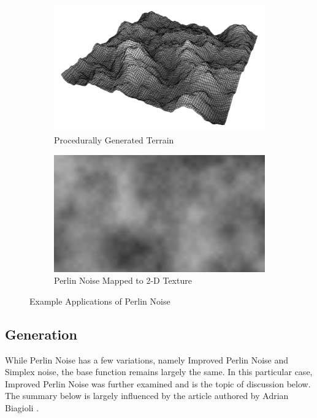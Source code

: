 \begin{figure}
    \centering
    \begin{subfigure}[b]{0.49\textwidth}
        \centering
        \includegraphics[width=\textwidth]{figures/body/methodology/perlin_noise_terrain_mesh.png}
        \caption{Procedurally Generated Terrain \cite{prunier}}
        \label{figure:perlin_noise_terrain_mesh}
    \end{subfigure}
    \begin{subfigure}[b]{0.49\textwidth}
        \centering
        \includegraphics[width=\textwidth]{figures/body/methodology/perlin_noise_texture.png}
        \caption{Perlin Noise Mapped to 2-D Texture \cite{perlin_noise_2007}}
        \label{figure:perlin_noise_texture}
    \end{subfigure}
    \caption{Example Applications of Perlin Noise}
\end{figure}

\subsection{Generation}
While Perlin Noise has a few variations, namely Improved Perlin Noise \cite{perlin_2002} and Simplex noise, the base function remains largely the same. In this particular case, Improved Perlin Noise was further examined and is the topic of discussion below. The summary below is largely influenced by the article authored by Adrian Biagioli \cite{biagioli_2014}.

